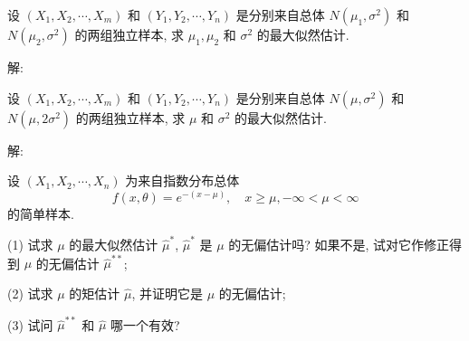 \documentclass[standard]{ExBook}
\begin{document}
\begin{qitems}
\vspace{-5em}

    \begin{bbox}
    \begin{shaded}
        \qitem
设 \((X_1, X_2, \cdots, X_m)\) 和 \((Y_1, Y_2, \cdots, Y_n)\) 是分别来自总体 \(N(\mu_1, \sigma^2)\) 和 \(N(\mu_2, \sigma^2)\) 的两组独立样本, 求 \(\mu_1, \mu_2\) 和 \(\sigma^2\) 的最大似然估计.
    \end{shaded}
    \end{bbox}

\vspace{-5em}

    \begin{bbox}
解: 
    \end{bbox}

\vspace{-5em}

    \begin{bbox}
    \begin{shaded}
        \qitem
设 \((X_1, X_2, \cdots, X_m)\) 和 \((Y_1, Y_2, \cdots, Y_n)\) 是分别来自总体 \(N(\mu, \sigma^2)\) 和 \(N(\mu, 2\sigma^2)\) 的两组独立样本, 求 \(\mu\) 和 \(\sigma^2\) 的最大似然估计.
    \end{shaded}
    \end{bbox}

\vspace{-5em}

    \begin{bbox}
解: 
    \end{bbox}

\vspace{-5em}

    \begin{bbox}
    \begin{shaded}
        \qitem
设 \((X_1, X_2, \cdots, X_n)\) 为来自指数分布总体  
\[ f(x, \theta) = e^{-(x - \mu)}, \quad x \geq \mu, -\infty < \mu < \infty \]  
的简单样本.  

(1) 试求 \(\mu\) 的最大似然估计 \(\hat{\mu}^*\), \(\hat{\mu}^*\) 是 \(\mu\) 的无偏估计吗? 如果不是, 试对它作修正得到 \(\mu\) 的无偏估计 \(\hat{\mu}^{**}\);

(2) 试求 \(\mu\) 的矩估计 \(\hat{\mu}\), 并证明它是 \(\mu\) 的无偏估计;

(3) 试问 \(\hat{\mu}^{**}\) 和 \(\hat{\mu}\) 哪一个有效?
    \end{shaded}
    \end{bbox}

\vspace{-5em}


\end{qitems}
\end{document}
